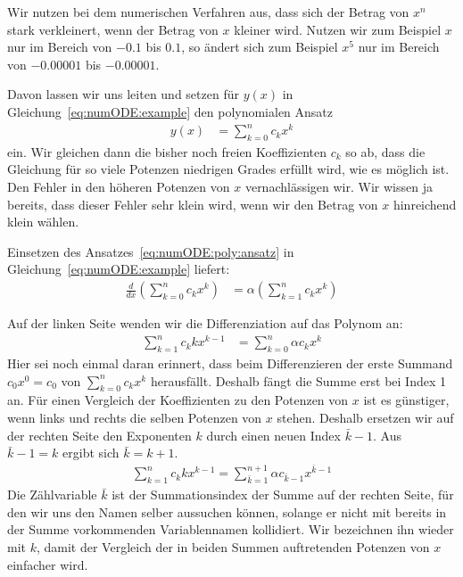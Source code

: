 \documentclass{article}
\let\l\left\let\r\right\let\cs\csname\let\ecs\endcsname\let\ea\expandafter
\def\ddx#1{\frac{d#1}{dx}}
\begin{document}
Wir nutzen bei dem numerischen Verfahren aus, dass sich der Betrag von
$x^n$ stark verkleinert, wenn der Betrag von $x$ kleiner wird. Nutzen
wir zum Beispiel $x$ nur im Bereich von $-0.1$ bis $0.1$, so ändert
sich zum Beispiel $x^5$ nur im Bereich von $-0.00001$ bis $-0.00001$.

Davon lassen wir uns leiten und setzen für $y(x)$ in Gleichung~\eqref{eq:numODE:example} den polynomialen Ansatz
\begin{align}
  y(x) &= \sum_{k=0}^n c_k x^k
         \label{eq:numODE:poly:ansatz}
\end{align}
ein. Wir gleichen dann die bisher noch freien Koeffizienten $c_k$ so
ab, dass die Gleichung für so viele Potenzen niedrigen Grades erfüllt
wird, wie es möglich ist. Den Fehler in den höheren Potenzen von $x$
vernachlässigen wir. Wir wissen ja bereits, dass dieser Fehler sehr
klein wird, wenn wir den Betrag von $x$ hinreichend klein wählen.

Einsetzen des Ansatzes~\eqref{eq:numODE:poly:ansatz} in Gleichung~\eqref{eq:numODE:example} liefert:
\begin{align*}
  \ddx{}\l(\sum_{k=0}^n c_k x^k\r) &=\alpha\l(\sum_{k=1}^n c_k x^k\r)
\end{align*}

Auf der linken Seite wenden wir die Differenziation auf das Polynom an:
\begin{align*}
  \sum_{k=1}^n c_k k x^{k-1} &= \sum_{k=0}^n  \alpha c_k x^k
\end{align*}
Hier sei noch einmal daran erinnert, dass beim Differenzieren der
erste Summand $c_0x^0=c_0$ von $\sum_{k=0}^n c_kx^k$
herausfällt. Deshalb fängt die Summe erst bei Index 1 an. Für einen
Vergleich der Koeffizienten zu den Potenzen von $x$ ist es günstiger,
wenn links und rechts die selben Potenzen von $x$ stehen. Deshalb
ersetzen wir auf der rechten Seite den Exponenten $k$ durch einen
neuen Index $\bar k-1$. Aus $\bar k-1 = k$ ergibt sich $\bar k=k+1$.
\begin{align*}
  \sum_{k = 1}^{n} c_k k x^{k-1} = \sum_{\bar k=1}^{n+1}  \alpha c_{\bar k-1} x^{\bar k-1}
\end{align*}
Die Zählvariable $\bar k$ ist der Summationsindex der Summe auf der
rechten Seite, für den wir uns den Namen selber aussuchen können,
solange er nicht mit bereits in der Summe vorkommenden Variablennamen
kollidiert. Wir bezeichnen ihn wieder mit $k$, damit der Vergleich der
in beiden Summen auftretenden Potenzen von $x$ einfacher wird.
\end{document}
